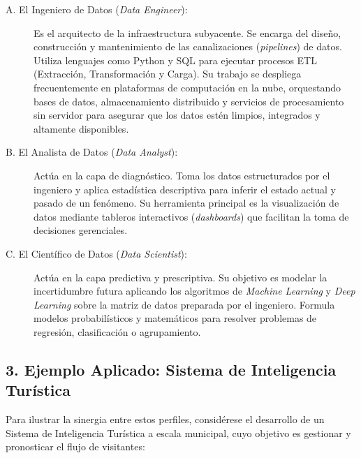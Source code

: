\begin{description}
    \item[A. El Ingeniero de Datos (\textit{Data Engineer}):] Es el arquitecto de la infraestructura subyacente. Se encarga del diseño, construcción y mantenimiento de las canalizaciones (\textit{pipelines}) de datos. Utiliza lenguajes como Python y SQL para ejecutar procesos ETL (Extracción, Transformación y Carga). Su trabajo se despliega frecuentemente en plataformas de computación en la nube, orquestando bases de datos, almacenamiento distribuido y servicios de procesamiento sin servidor para asegurar que los datos estén limpios, integrados y altamente disponibles.
    \item[B. El Analista de Datos (\textit{Data Analyst}):] Actúa en la capa de diagnóstico. Toma los datos estructurados por el ingeniero y aplica estadística descriptiva para inferir el estado actual y pasado de un fenómeno. Su herramienta principal es la visualización de datos mediante tableros interactivos (\textit{dashboards}) que facilitan la toma de decisiones gerenciales.
    \item[C. El Científico de Datos (\textit{Data Scientist}):] Actúa en la capa predictiva y prescriptiva. Su objetivo es modelar la incertidumbre futura aplicando los algoritmos de \textit{Machine Learning} y \textit{Deep Learning} sobre la matriz de datos preparada por el ingeniero. Formula modelos probabilísticos y matemáticos para resolver problemas de regresión, clasificación o agrupamiento.
\end{description}

\subsection{3. Ejemplo Aplicado: Sistema de Inteligencia Turística}
Para ilustrar la sinergia entre estos perfiles, considérese el desarrollo de un Sistema de Inteligencia Turística a escala municipal, cuyo objetivo es gestionar y pronosticar el flujo de visitantes:

